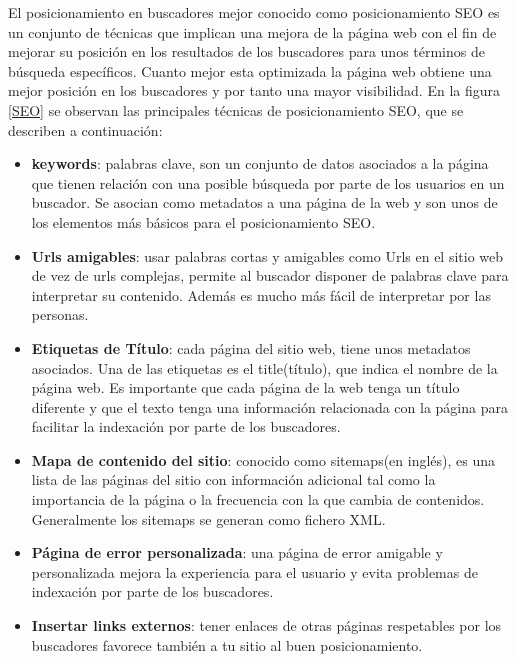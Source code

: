 El posicionamiento en buscadores mejor conocido como posicionamiento SEO es un conjunto de técnicas que implican una mejora de la página web con el fin de mejorar su posición en los resultados de los buscadores para unos términos de búsqueda específicos. Cuanto mejor esta optimizada la página web obtiene una mejor posición en los buscadores y por tanto una mayor visibilidad. En la figura \ref{SEO} se observan las principales técnicas de posicionamiento SEO, que se describen a continuación:

\begin{itemize}

\item \textbf{keywords}: palabras clave, son un conjunto de datos asociados a la página que tienen relación con una posible búsqueda por parte de los usuarios en un buscador. Se asocian como metadatos a una página de la web y son unos de los elementos más básicos para el posicionamiento SEO.

\item \textbf{Urls amigables}: usar palabras cortas y amigables como Urls en el sitio web de vez de urls complejas, permite al buscador disponer de palabras clave para interpretar su contenido. Además es mucho más fácil de interpretar por las personas.

\item \textbf{Etiquetas de Título}: cada página del sitio web, tiene unos metadatos asociados. Una de las etiquetas es el title(título), que indica el nombre de la página web. Es importante que cada página de la web tenga un título diferente y que el texto tenga una información relacionada con la página para facilitar la indexación por parte de los buscadores.

\item \textbf{Mapa de contenido del sitio}: conocido como sitemaps(en inglés), es una lista de las páginas del sitio con información adicional tal como la importancia de la página o la frecuencia con la que cambia de contenidos. Generalmente los sitemaps se generan como fichero XML.

\item \textbf{Página de error personalizada}: una página de error amigable y personalizada mejora la experiencia para el usuario y evita problemas de indexación por parte de los buscadores.

\item \textbf{Insertar links externos}: tener enlaces de otras páginas respetables por los buscadores favorece también a tu sitio al buen posicionamiento.


\end{itemize}
